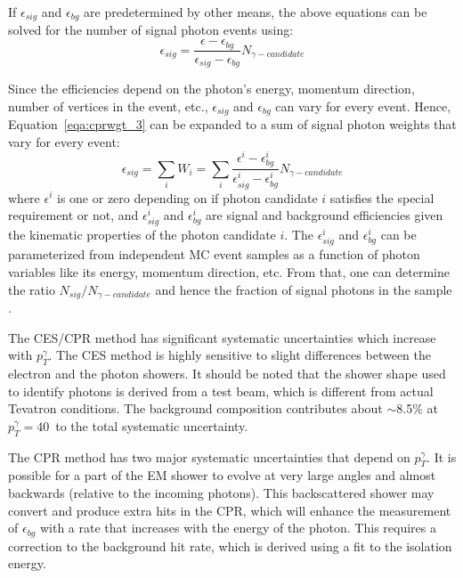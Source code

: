 If $\epsilon_{sig}$ and $\epsilon_{bg}$ are predetermined by other means, the above equations can be solved for the number of signal photon events using:
\begin{equation}
\epsilon_{sig} = \frac{\epsilon - \epsilon_{bg}}{\epsilon_{sig} - \epsilon_{bg}} N_{\gamma-candidate}
 \label{eqa:cprwgt_3}
\end{equation}

Since the efficiencies depend on the photon's energy, momentum direction, number of vertices in the event, etc., $\epsilon_{sig}$ and $\epsilon_{bg}$ can vary for every event. Hence, Equation~\ref{eqa:cprwgt_3} can be expanded to a sum of signal photon weights that vary for every event:
\begin{equation}
 \epsilon_{sig} = \sum_i W_i = \sum_i \frac{\epsilon^{i} - \epsilon_{bg}^{i}}{\epsilon_{sig}^{i} - \epsilon_{bg}^{i}} N_{\gamma-candidate}
 \label{eqa:cprwgt_4}
\end{equation}
\noindent where $\epsilon^i$ is one or zero depending on if photon candidate $i$ satisfies the special requirement or not, and $\epsilon_{sig}^i$ and $\epsilon_{bg}^i$ are signal and background efficiencies given the kinematic properties of the photon candidate $i$. The $\epsilon_{sig}^i$ and $\epsilon_{bg}^i$ can be parameterized from independent MC event samples as a function of photon variables like its energy, momentum direction, etc. From that, one can determine the ratio $N_{sig}/N_{\gamma-candidate}$ and hence the fraction of signal photons in the sample \cite{pap:PhotonIDAndCESCPR}.

The CES/CPR method has significant systematic uncertainties which increase with $p_{T}^{\gamma}$. The CES method is highly sensitive to slight differences between the electron and the photon showers. It should be noted that the shower shape used to identify photons is derived from a test beam, which is different from actual Tevatron conditions. The background composition contributes about $\sim$8.5\% at $p_{T}^{\gamma}=40$~\epUnits to the total systematic uncertainty.

The CPR method has two major systematic uncertainties that depend on $p_{T}^{\gamma}$. It is possible for a part of the EM shower to evolve at very large angles and almost backwards (relative to the incoming photons). This backscattered shower may convert and produce extra hits in the CPR, which will enhance the measurement of $\epsilon_{bg}$ with a rate that increases with the energy of the photon. This requires a correction to the background hit rate, which is derived using a fit to the isolation energy.